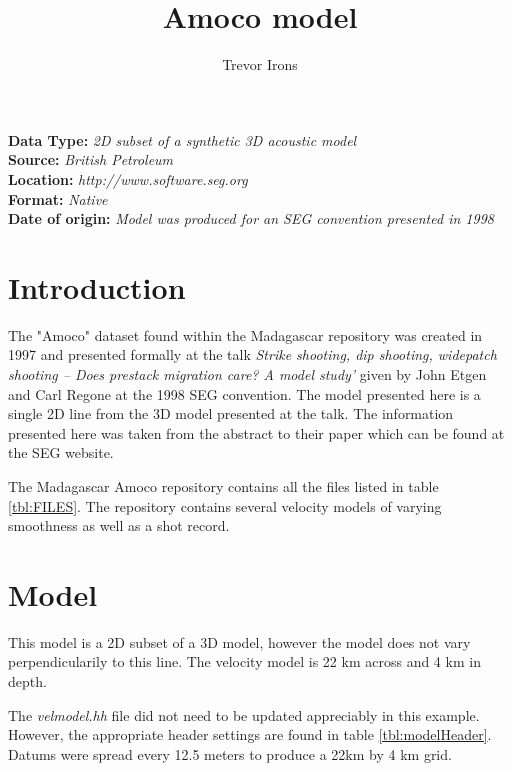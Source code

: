 \title{Amoco model}
\author{Trevor Irons}
\maketitle
\lstset{language=python,numbers=left,numberstyle=\tiny,showstringspaces=false}

\noindent
\textbf {Data Type:} \emph{2D subset of a synthetic 3D acoustic model}\\
\textbf {Source:} \emph{British Petroleum}\\
\textbf {Location:} \emph{http://www.software.seg.org}\\
\textbf {Format:} \emph{Native} \\
\textbf{Date of origin:} \emph{Model was produced for an SEG convention presented in 1998}\\

\section{Introduction}
The "Amoco" dataset found within the Madagascar repository was created in 1997 and presented 
formally at the talk \emph{Strike shooting, dip shooting, widepatch shooting -- Does prestack 
migration care? A model study'} given by John Etgen and Carl Regone at the 1998 SEG convention.  
The model presented here is a single 2D line from the 3D model presented at the talk.  
The information presented here was taken from the abstract to their paper which can be found at the SEG website.  

The Madagascar Amoco repository contains all the files listed in table \ref{tbl:FILES}.  The repository contains several velocity models of varying smoothness as well as a shot record.   

{
\tiny

\normalsize
}

\section{Model}
This model is a 2D subset of a 3D model, however the model does not vary perpendicularily to this line.  The velocity model is 22 km across and 4 km in depth.

The \emph{velmodel.hh} file did not need to be updated appreciably in this example.  However, the appropriate header settings are found in table \ref{tbl:modelHeader}.  Datums were spread every 12.5 meters to produce a 22km by 4 km grid.  
 
